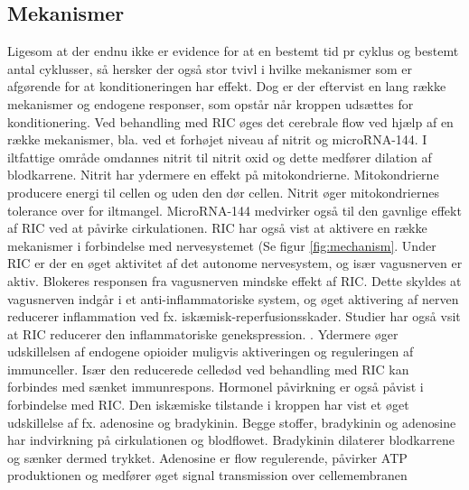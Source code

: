 \subsection{Mekanismer}
Ligesom at der endnu ikke er evidence for at en bestemt tid pr cyklus og bestemt antal cyklusser, så hersker der også stor tvivl i hvilke mekanismer som er afgørende for at konditioneringen har effekt.  Dog er der eftervist en lang række mekanismer og endogene responser, som opstår når kroppen udsættes for konditionering. Ved behandling med RIC øges det cerebrale flow ved hjælp af en række mekanismer, bla. ved et forhøjet niveau af nitrit og microRNA-144. I iltfattige område omdannes nitrit til nitrit oxid og dette medfører dilation af blodkarrene. Nitrit har ydermere en effekt på mitokondrierne. Mitokondrierne producere energi til cellen og uden den dør cellen. Nitrit øger mitokondriernes tolerance over for iltmangel. MicroRNA-144 medvirker også til den gavnlige effekt af RIC ved at påvirke cirkulationen.
RIC har også vist at aktivere en række mekanismer i forbindelse med nervesystemet (Se figur \ref{fig:mechanism}. Under RIC er der en øget aktivitet af det autonome nervesystem, og især vagusnerven er aktiv. Blokeres responsen fra vagusnerven mindske effekt af RIC. Dette skyldes at vagusnerven indgår i et anti-inflammatoriske system, og øget aktivering af nerven reducerer inflammation ved fx. iskæmisk-reperfusionsskader. Studier har også vsit at RIC reducerer den inflammatoriske genekspression. . Ydermere  øger udskillelsen af endogene opioider muligvis aktiveringen og reguleringen af immunceller. Især den reducerede celledød ved behandling med RIC kan forbindes med sænket immunrespons. Hormonel påvirkning er også påvist i forbindelse med RIC. Den iskæmiske tilstande i kroppen har vist et øget udskillelse af fx. adenosine og bradykinin. Begge stoffer, bradykinin og adenosine har indvirkning på cirkulationen og blodflowet. Bradykinin dilaterer blodkarrene og sænker dermed trykket. Adenosine er flow regulerende, påvirker ATP produktionen og medfører øget signal transmission over cellemembranen 

